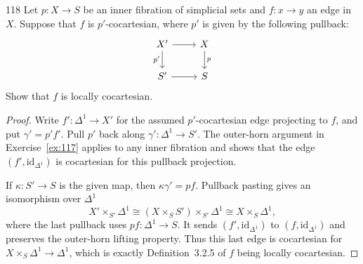 \begin{exercise}{118}
Let $p\colon X\to S$ be an inner fibration of simplicial sets and $f\colon x\to y$ an edge
in $X$. Suppose that $f$ is $p'$-cocartesian, where $p'$ is given by the following pullback:
\[
\begin{tikzcd}
 X' \arrow[r] \arrow[d,"p'"'] & X \arrow[d,"p"] \\
 S' \arrow[r] & S
\end{tikzcd}
\]
Show that $f$ is locally cocartesian.

\begin{proof}
Write $f'\colon\Delta^1\to X'$ for the assumed $p'$-cocartesian edge
projecting to $f$, and put $\gamma'=p'f'$.
Pull $p'$ back along $\gamma'\colon\Delta^1\to S'$.
The outer-horn argument in Exercise~\ref{ex:117} applies to any inner
fibration and shows that the edge $(f',\mathrm{id}_{\Delta^1})$
is cocartesian for this pullback projection.

If $\kappa\colon S'\to S$ is the given map, then $\kappa\gamma'=pf$.
Pullback pasting gives an isomorphism over $\Delta^1$
\[
 X'\times_{S'}\Delta^1
 \cong (X\times_S S')\times_{S'}\Delta^1
 \cong X\times_S\Delta^1,
\]
where the last pullback uses $pf\colon\Delta^1\to S$.
It sends $(f',\mathrm{id}_{\Delta^1})$ to $(f,\mathrm{id}_{\Delta^1})$
and preserves the outer-horn lifting property.
Thus this last edge is cocartesian for $X\times_S\Delta^1\to\Delta^1$,
which is exactly Definition~3.2.5 of $f$ being locally cocartesian.
\end{proof}
\end{exercise}
